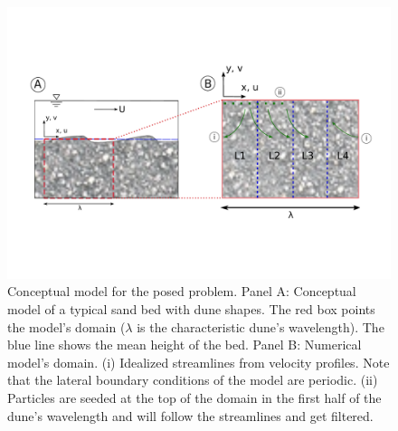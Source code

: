 \documentclass[draft,linenumbers]{agujournal2018}
\begin{document}
\begin{figure}[ht]
\centering
\includegraphics[trim=0.2cm 0.2cm 0.2cm 0.2cm, width=35pc]
{190212_Conceptual.pdf}
\caption{Conceptual model for the posed problem. Panel A: Conceptual model of a typical sand bed with dune shapes. The red box points the model's domain ($\lambda$ is the characteristic dune's wavelength). The blue line shows the mean height of the bed. Panel B: Numerical model's domain. (i) Idealized streamlines from velocity profiles. Note that the lateral boundary conditions of the model are periodic. (ii) Particles are seeded at the top of the domain in the first half of the dune's wavelength and will follow the streamlines and get filtered.}
\label{Conceptual}
\end{figure}
\end{document}
